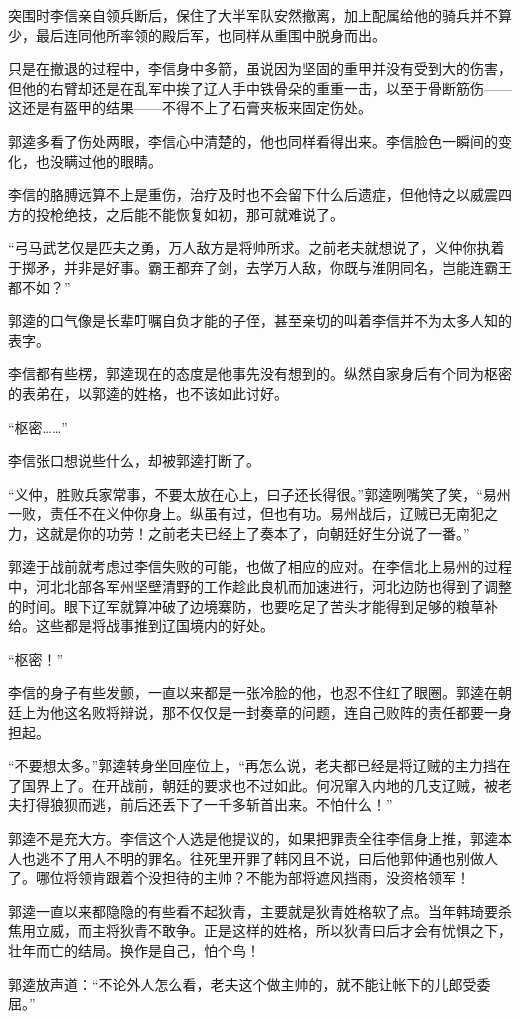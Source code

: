 突围时李信亲自领兵断后，保住了大半军队安然撤离，加上配属给他的骑兵并不算少，最后连同他所率领的殿后军，也同样从重围中脱身而出。

只是在撤退的过程中，李信身中多箭，虽说因为坚固的重甲并没有受到大的伤害，但他的右臂却还是在乱军中挨了辽人手中铁骨朵的重重一击，以至于骨断筋伤——这还是有盔甲的结果——不得不上了石膏夹板来固定伤处。

郭逵多看了伤处两眼，李信心中清楚的，他也同样看得出来。李信脸色一瞬间的变化，也没瞒过他的眼睛。

李信的胳膊远算不上是重伤，治疗及时也不会留下什么后遗症，但他恃之以威震四方的投枪绝技，之后能不能恢复如初，那可就难说了。

“弓马武艺仅是匹夫之勇，万人敌方是将帅所求。之前老夫就想说了，义仲你执着于掷矛，并非是好事。霸王都弃了剑，去学万人敌，你既与淮阴同名，岂能连霸王都不如？”

郭逵的口气像是长辈叮嘱自负才能的子侄，甚至亲切的叫着李信并不为太多人知的表字。

李信都有些楞，郭逵现在的态度是他事先没有想到的。纵然自家身后有个同为枢密的表弟在，以郭逵的姓格，也不该如此讨好。

“枢密……”

李信张口想说些什么，却被郭逵打断了。

“义仲，胜败兵家常事，不要太放在心上，曰子还长得很。”郭逵咧嘴笑了笑，“易州一败，责任不在义仲你身上。纵虽有过，但也有功。易州战后，辽贼已无南犯之力，这就是你的功劳！之前老夫已经上了奏本了，向朝廷好生分说了一番。”

郭逵于战前就考虑过李信失败的可能，也做了相应的应对。在李信北上易州的过程中，河北北部各军州坚壁清野的工作趁此良机而加速进行，河北边防也得到了调整的时间。眼下辽军就算冲破了边境寨防，也要吃足了苦头才能得到足够的粮草补给。这些都是将战事推到辽国境内的好处。

“枢密！”

李信的身子有些发颤，一直以来都是一张冷脸的他，也忍不住红了眼圈。郭逵在朝廷上为他这名败将辩说，那不仅仅是一封奏章的问题，连自己败阵的责任都要一身担起。

“不要想太多。”郭逵转身坐回座位上，“再怎么说，老夫都已经是将辽贼的主力挡在了国界上了。在开战前，朝廷的要求也不过如此。何况窜入内地的几支辽贼，被老夫打得狼狈而逃，前后还丢下了一千多斩首出来。不怕什么！”

郭逵不是充大方。李信这个人选是他提议的，如果把罪责全往李信身上推，郭逵本人也逃不了用人不明的罪名。往死里开罪了韩冈且不说，曰后他郭仲通也别做人了。哪位将领肯跟着个没担待的主帅？不能为部将遮风挡雨，没资格领军！

郭逵一直以来都隐隐的有些看不起狄青，主要就是狄青姓格软了点。当年韩琦要杀焦用立威，而主将狄青不敢争。正是这样的姓格，所以狄青曰后才会有忧惧之下，壮年而亡的结局。换作是自己，怕个鸟！

郭逵放声道：“不论外人怎么看，老夫这个做主帅的，就不能让帐下的儿郎受委屈。”
